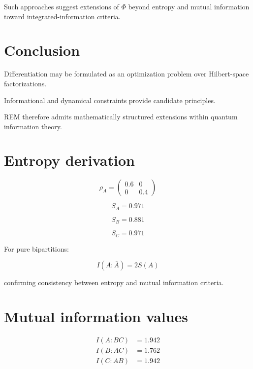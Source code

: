 \documentclass[11pt]{article}
\begin{document}
Such approaches suggest extensions of $\Phi$ beyond entropy and mutual information toward integrated-information criteria.

\section{Conclusion}

Differentiation may be formulated as an optimization problem over Hilbert-space factorizations.

Informational and dynamical constraints provide candidate principles.

REM therefore admits mathematically structured extensions within quantum information theory.

\appendix

\section{Entropy derivation}

\begin{equation}
\rho_A =
\begin{pmatrix}
0.6 & 0 \\
0 & 0.4
\end{pmatrix}
\end{equation}

\begin{equation}
S_A = 0.971
\end{equation}

\begin{equation}
S_B = 0.881
\end{equation}

\begin{equation}
S_C = 0.971
\end{equation}

For pure bipartitions:

\begin{equation}
I(A:\bar A) = 2 S(A)
\end{equation}

confirming consistency between entropy and mutual information criteria.

\section{Mutual information values}

\begin{align}
I(A:BC) &= 1.942 \\
I(B:AC) &= 1.762 \\
I(C:AB) &= 1.942
\end{align}
\end{document}
